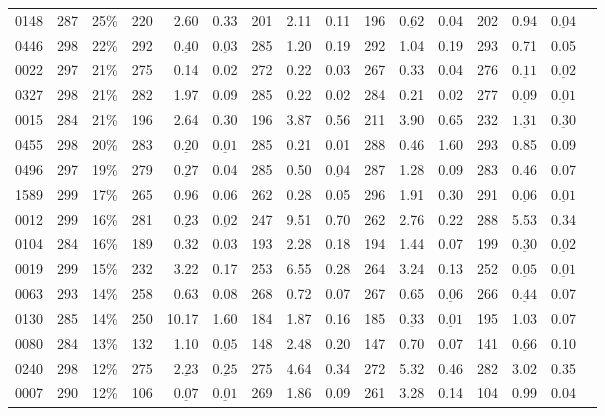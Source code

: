 \documentclass{article}
\begin{document}
\begin{table}[t]
\begin{tabular}{lrrrrrrrrrrrrrrr}
0148 & 287 & 25\% & 220 & 2.60 & 0.33 & 201 & 2.11 & 0.11 & 196 & $\underline{\mathbf{0.62}}$ & 0.04 & 202 & 0.94 & $\underline{\mathbf{0.04}}$\\
0446 & 298 & 22\% & 292 & $\underline{\mathbf{0.40}}$ & $\underline{\mathbf{0.03}}$ & 285 & 1.20 & 0.19 & 292 & 1.04 & 0.19 & 293 & 0.71 & 0.05\\
0022 & 297 & 21\% & 275 & 0.14 & 0.02 & 272 & 0.22 & 0.03 & 267 & 0.33 & 0.04 & 276 & $\underline{\mathbf{0.11}}$ & $\underline{\mathbf{0.02}}$\\
0327 & 298 & 21\% & 282 & 1.97 & 0.09 & 285 & 0.22 & 0.02 & 284 & 0.21 & 0.02 & 277 & $\underline{\mathbf{0.09}}$ & $\underline{\mathbf{0.01}}$\\
0015 & 284 & 21\% & 196 & 2.64 & 0.30 & 196 & 3.87 & 0.56 & 211 & 3.90 & 0.65 & 232 & $\underline{\mathbf{1.31}}$ & $\underline{\mathbf{0.30}}$\\
0455 & 298 & 20\% & 283 & $\underline{\mathbf{0.20}}$ & $\underline{\mathbf{0.01}}$ & 285 & 0.21 & 0.01 & 288 & 0.46 & 1.60 & 293 & 0.85 & 0.09\\
0496 & 297 & 19\% & 279 & $\underline{\mathbf{0.27}}$ & 0.04 & 285 & 0.50 & $\underline{\mathbf{0.04}}$ & 287 & 1.28 & 0.09 & 283 & 0.46 & 0.07\\
1589 & 299 & 17\% & 265 & 0.96 & 0.06 & 262 & 0.28 & 0.05 & 296 & 1.91 & 0.30 & 291 & $\underline{\mathbf{0.06}}$ & $\underline{\mathbf{0.01}}$\\
0012 & 299 & 16\% & 281 & $\underline{\mathbf{0.23}}$ & $\underline{\mathbf{0.02}}$ & 247 & 9.51 & 0.70 & 262 & 2.76 & 0.22 & 288 & 5.53 & 0.34\\
0104 & 284 & 16\% & 189 & 0.32 & 0.03 & 193 & 2.28 & 0.18 & 194 & 1.44 & 0.07 & 199 & $\underline{\mathbf{0.30}}$ & $\underline{\mathbf{0.02}}$\\
0019 & 299 & 15\% & 232 & 3.22 & 0.17 & 253 & 6.55 & 0.28 & 264 & 3.24 & 0.13 & 252 & $\underline{\mathbf{0.05}}$ & $\underline{\mathbf{0.01}}$\\
0063 & 293 & 14\% & 258 & 0.63 & 0.08 & 268 & 0.72 & 0.07 & 267 & 0.65 & $\underline{\mathbf{0.06}}$ & 266 & $\underline{\mathbf{0.44}}$ & 0.07\\
0130 & 285 & 14\% & 250 & 10.17 & 1.60 & 184 & 1.87 & 0.16 & 185 & $\underline{\mathbf{0.33}}$ & $\underline{\mathbf{0.01}}$ & 195 & 1.03 & 0.07\\
0080 & 284 & 13\% & 132 & 1.10 & $\underline{\mathbf{0.05}}$ & 148 & 2.48 & 0.20 & 147 & 0.70 & 0.07 & 141 & $\underline{\mathbf{0.66}}$ & 0.10\\
0240 & 298 & 12\% & 275 & $\underline{\mathbf{2.23}}$ & $\underline{\mathbf{0.25}}$ & 275 & 4.64 & 0.34 & 272 & 5.32 & 0.46 & 282 & 3.02 & 0.35\\
0007 & 290 & 12\% & 106 & $\underline{\mathbf{0.07}}$ & $\underline{\mathbf{0.01}}$ & 269 & 1.86 & 0.09 & 261 & 3.28 & 0.14 & 104 & 0.99 & 0.04\\
\bottomrule
\end{tabular}
\end{table}
\end{document}
